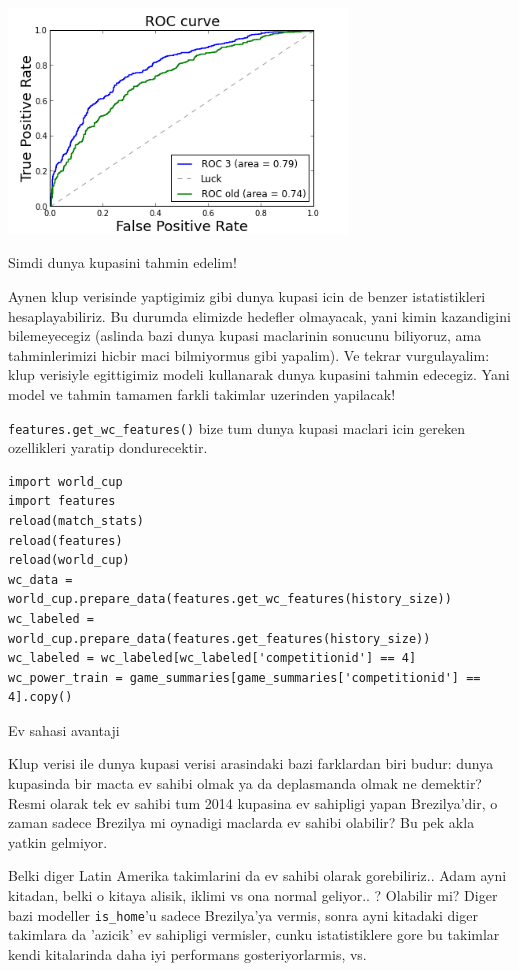 \documentclass[12pt,fleqn]{article}\usepackage{../common}
\begin{document}
\includegraphics[height=6cm]{doc_en_02.png}

Simdi dunya kupasini tahmin edelim!

Aynen klup verisinde yaptigimiz gibi dunya kupasi icin de benzer
istatistikleri hesaplayabiliriz. Bu durumda elimizde hedefler olmayacak,
yani kimin kazandigini bilemeyecegiz (aslinda bazi dunya kupasi maclarinin
sonucunu biliyoruz, ama tahminlerimizi hicbir maci bilmiyormus gibi
yapalim). Ve tekrar vurgulayalim: klup verisiyle egittigimiz modeli
kullanarak dunya kupasini tahmin edecegiz. Yani model ve tahmin tamamen
farkli takimlar uzerinden yapilacak!

\verb!features.get_wc_features()! bize tum dunya kupasi maclari icin
gereken ozellikleri yaratip dondurecektir.

\begin{verbatim}
import world_cup
import features
reload(match_stats)
reload(features)
reload(world_cup)
wc_data = world_cup.prepare_data(features.get_wc_features(history_size))
wc_labeled = world_cup.prepare_data(features.get_features(history_size))
wc_labeled = wc_labeled[wc_labeled['competitionid'] == 4]
wc_power_train = game_summaries[game_summaries['competitionid'] == 4].copy()
\end{verbatim}

Ev sahasi avantaji

Klup verisi ile dunya kupasi verisi arasindaki bazi farklardan biri budur:
dunya kupasinda bir macta ev sahibi olmak ya da deplasmanda olmak ne
demektir?  Resmi olarak tek ev sahibi tum 2014 kupasina ev sahipligi yapan
Brezilya'dir, o zaman sadece Brezilya mi oynadigi maclarda ev sahibi
olabilir? Bu pek akla yatkin gelmiyor.

Belki diger Latin Amerika takimlarini da ev sahibi olarak
gorebiliriz.. Adam ayni kitadan, belki o kitaya alisik, iklimi vs ona
normal geliyor.. ? Olabilir mi? Diger bazi modeller \verb!is_home!'u sadece
Brezilya'ya vermis, sonra ayni kitadaki diger takimlara da 'azicik' ev
sahipligi vermisler, cunku istatistiklere gore bu takimlar kendi
kitalarinda daha iyi performans gosteriyorlarmis, vs.
\end{document}
